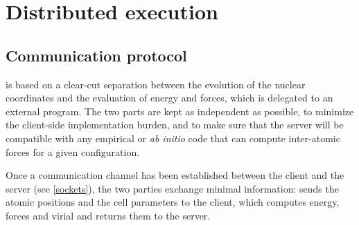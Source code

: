 \documentclass[11pt,english,fleqn]{report}
\begin{document}
\section{Distributed execution}

\label{distrib}

\subsection{Communication protocol}

\ipi is based on a clear-cut separation between the 
evolution of the nuclear coordinates and the evaluation of energy
and forces, which is delegated to an external program.
The two parts are kept as independent as possible, to minimize
the client-side implementation burden, and to make sure that the 
server will be compatible with any empirical or \emph{ab initio} code that 
can compute inter-atomic forces for a given configuration.

Once a communication channel has been established between the 
client and the server (see \ref{sockets}), the two parties
exchange minimal information: \ipi{} sends the atomic positions
and the cell parameters to the client, which computes energy, forces
and virial and returns them to the server. 
\end{document}
